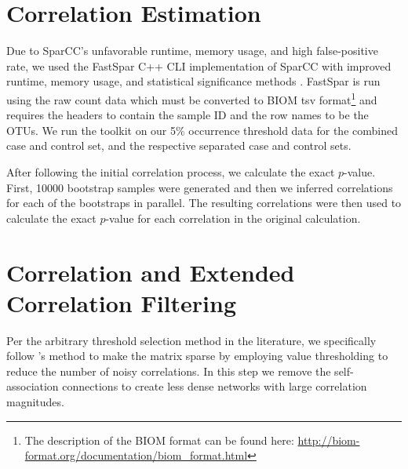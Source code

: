 
\section{Correlation Estimation}\label{meth:spar}
Due to \acrshort{SparCC}'s unfavorable runtime, memory usage, and high false-positive rate, we used the \acrshort{FastSpar} C++ \acrfull{CLI} implementation of \acrshort{SparCC} with improved runtime, memory usage, and statistical significance methods \citep{Friedman2012,Watts2018}. \acrshort{FastSpar} is run using the raw count data which must be converted to BIOM tsv format\footnote{The description of the BIOM format can be found here: \url{http://biom-format.org/documentation/biom_format.html}} and requires the headers to contain the sample ID and the row names to be the \acrshort{OTU}s. We run the toolkit on our 5\% occurrence threshold data for the combined case and control set, and the respective separated case and control sets. 

After following the initial correlation process, we calculate the exact $p$-value. First, 10000 bootstrap samples were generated and then we inferred correlations for each of the bootstraps in parallel. The resulting correlations were then used to calculate the exact $p$-value for each correlation in the original calculation. 

\section{Correlation and Extended Correlation Filtering}\label{meth:filtering}

Per the arbitrary threshold selection method in the literature, we specifically follow \citet{Friedman2012}'s method to make the matrix sparse by employing value thresholding to reduce the number of noisy correlations. In this step we remove the self-association connections to create less dense networks with large correlation magnitudes.

